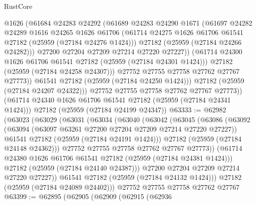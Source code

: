 \begin{lexlean}{RustCore}
\begin{coremodule}
                  @1626
                  (@61684
                    @24283
                    @24292
                    (@61689
                      @24283
                      @24290
                      @1671
                      (@61697
                        @24282
                        @24289
                        @1616
                        @24265
                        @1626
                        @61706
                        (@61714 @24275 @1626 @61706 @61541 @27182 (@25959 (@27184 @24276 @1424)))
                        @27182
                        (@25959 (@27184 @24266 @24282)))
                      @27200
                      @27204
                      @27209
                      @27214
                      @27220
                      @27227))
                  (@61714 @24300 @1626 @61706 @61541 @27182 (@25959 (@27184 @24301 @1424)))
                  @27182
                  (@25959 (@27184 @24258 @24307)))
                @27752
                @27755
                @27758
                @27762
                @27767
                @27773))
            @61541
            @27182
            (@25959 (@27184 @24250 @1424)))
          @27182
          (@25959 (@27184 @24207 @24322)))
        @27752
        @27755
        @27758
        @27762
        @27767
        @27773))
    (@61714 @24340 @1626 @61706 @61541 @27182 (@25959 (@27184 @24341 @1424)))
    @27182
    (@25959 (@27184 @24199 @24347))
@63333 := @62982
    (@63023
      (@63029
        (@63031
          (@63034
            (@63040
              (@63042
                (@63045
                  (@63086
                    (@63092
                      (@63094 (@63097 @63261 @27200 @27204 @27209 @27214 @27220 @27227))
                      @61541
                      @27182
                      (@25959 (@27184 @24191 @1424)))
                    @27182
                    (@25959 (@27184 @24148 @24362)))
                  @27752
                  @27755
                  @27758
                  @27762
                  @27767
                  @27773))
              (@61714 @24380 @1626 @61706 @61541 @27182 (@25959 (@27184 @24381 @1424)))
              @27182
              (@25959 (@27184 @24140 @24387)))
            @27200
            @27204
            @27209
            @27214
            @27220
            @27227))
        @61541
        @27182
        (@25959 (@27184 @24132 @1424)))
      @27182
      (@25959 (@27184 @24089 @24402)))
    @27752
    @27755
    @27758
    @27762
    @27767
@63399 := @62895
    (@62905
      (@62909
        (@62915
          (@62936

\end{coremodule}
\end{lexlean}

